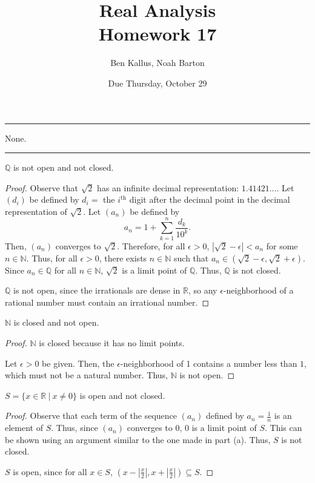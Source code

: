 \documentclass[12pt]{article}
\title{Real Analysis \\ Homework 17}
\author{Ben Kallus, Noah Barton}
\date{Due Thursday, October 29}
\begin{document}
\pagecolor{black}
\color{white}
\maketitle

\hrule
\bigskip

 None.

\bigskip
\hrule
\bigskip


\medskip
{} $\mathbb Q$ is not open and not closed.
\begin{proof}
    Observe that $\sqrt2$ has an infinite decimal representation: $1.41421...$. Let $(d_i)$ be defined by $d_i =$ the $i^\text{th}$ digit after the decimal point in the decimal representation of $\sqrt2$. Let $(a_n)$ be defined by $$a_n = 1 + \sum_{k=1}^n \frac{d_k}{10^k}.$$
    Then, $(a_n)$ converges to $\sqrt2$. Therefore, for all $\epsilon > 0$, $|\sqrt2 - \epsilon| < a_n$ for some $n \in \mathbb N$. Thus, for all $\epsilon > 0$, there exists $n \in \mathbb N$ such that $a_n \in (\sqrt2 - \epsilon, \sqrt2 + \epsilon)$. Since $a_n \in \mathbb Q$ for all $n \in \mathbb N$, $\sqrt2$ is a limit point of $\mathbb Q$. Thus, $\mathbb Q$ is not closed.
    
    $\mathbb Q$ is not open, since the irrationals are dense in $\mathbb R$, so any $\epsilon$-neighborhood of a rational number must contain an irrational number.
\end{proof}

\medskip
{} $\mathbb N$ is closed and not open.
\begin{proof}
    $\mathbb N$ is closed because it has no limit points.

    Let $\epsilon > 0$ be given. Then, the $\epsilon$-neighborhood of 1 contains a number less than $1$, which must not be a natural number. Thus, $\mathbb N$ is not open.
\end{proof}

\medskip
{} $S = \{x \in \mathbb R~|~x \neq 0\}$ is open and not closed.
\begin{proof}
    Observe that each term of the sequence $(a_n)$ defined by $a_n=\frac1n$ is an element of $S$. Thus, since $(a_n)$ converges to 0, 0 is a limit point of $S$. This can be shown using an argument similar to the one made in part (a). Thus, $S$ is not closed.

    $S$ is open, since for all $x \in S$, $(x - \left|\frac x2 \right|, x + \left|\frac x2 \right|) \subseteq S$.
\end{proof}
\end{document}
